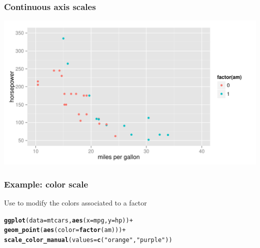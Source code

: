 \documentclass[12pt]{beamer}\usepackage[]{graphicx}\usepackage[]{color}
\makeatletter
\newcommand{\hlstr}[1]{\textcolor[rgb]{0.192,0.494,0.8}{#1}}%
\newcommand{\hlopt}[1]{\textcolor[rgb]{0,0,0}{#1}}%
\newcommand{\hlstd}[1]{\textcolor[rgb]{0.345,0.345,0.345}{#1}}%
\newcommand{\hlkwc}[1]{\textcolor[rgb]{0.333,0.667,0.333}{#1}}%
\newcommand{\hlkwd}[1]{\textcolor[rgb]{0.737,0.353,0.396}{\textbf{#1}}}%
\newenvironment{kframe}{%
 \def\at@end@of@kframe{}%
 \ifinner\ifhmode%
  \def\at@end@of@kframe{\end{minipage}}%
  \begin{minipage}{\columnwidth}%
 \fi\fi%
 \def\FrameCommand##1{\hskip\@totalleftmargin \hskip-\fboxsep
 \colorbox{shadecolor}{##1}\hskip-\fboxsep
     \hskip-\linewidth \hskip-\@totalleftmargin \hskip\columnwidth}%
 \MakeFramed {\advance\hsize-\width
   \@totalleftmargin\z@ \linewidth\hsize
   \@setminipage}}%
 {\par\unskip\endMakeFramed%
 \at@end@of@kframe}
\newenvironment{knitrout}{}{} %
\makeatother
\begin{document}

\begin{frame}[fragile]
\frametitle{Continuous axis scales}
\begin{knitrout}\footnotesize
{}\color{fgcolor}

{\centering \includegraphics[width=.9\linewidth,height=.5\linewidth]{figure/scale_y-1} 

}



\end{knitrout}
\end{frame}


\begin{frame}[fragile]
\frametitle{Example: color scale}

Use  to modify the colors associated to a factor
\begin{knitrout}\footnotesize
{}\color{fgcolor}\begin{kframe}
\begin{alltt}
\hlkwd{ggplot}\hlstd{(}\hlkwc{data} \hlstd{= mtcars,} \hlkwd{aes}\hlstd{(}\hlkwc{x} \hlstd{= mpg,} \hlkwc{y} \hlstd{= hp))} \hlopt{+}
  \hlkwd{geom_point}\hlstd{(}\hlkwd{aes}\hlstd{(}\hlkwc{color} \hlstd{=} \hlkwd{factor}\hlstd{(am)))} \hlopt{+}
  \hlkwd{scale_color_manual}\hlstd{(}\hlkwc{values} \hlstd{=} \hlkwd{c}\hlstd{(}\hlstr{"orange"}\hlstd{,} \hlstr{"purple"}\hlstd{))}
\end{alltt}
\end{kframe}
\end{knitrout}

\end{frame}
\end{document}
